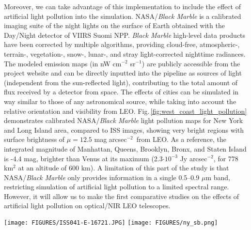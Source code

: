 \documentclass[usenames,dvipsnames,modern]{CLASS_FILES/aastex631}  %
\newcommand{\magarc}{mag arcsec\ensuremath{^{\mathrm{-2}}}}
\begin{document}
Moreover, we can take advantage of this implementation to include the effect of artificial light pollution into the simulation. NASA/\emph{Black Marble} \citep{roman+2018RSE210_113} is a calibrated imaging suite of the night lights on the surface of Earth obtained with the Day/Night detector of VIIRS Suomi NPP. \emph{Black Marble} high-level data products have been corrected by multiple algorithms, providing cloud-free, atmospheric-, terrain-, vegetation-, snow-, lunar-, and stray light-corrected nighttime radiances. The modeled emission maps (in nW cm$^{-2}$ sr$^{-1}$) are publicly accessible from the project website and  can be directly inputted into the pipeline as sources of light (independent from the sun-reflected light), contributing to the total amount of flux received by a detector from space. The effects of cities can be simulated in way similar to those of any astronomical source, while taking into account the relative orientation and visibility from LEO. Fig.\,\ref{fig:west_coast_light_pollution} demonstrates calibrated NASA/\emph{Black Marble} light pollution maps for New York and Long Island area, compared to ISS images, showing very bright regions with surface brightness of $\mu=12.5$ \magarc\ from LEO. As a reference, the integrated magnitude of Manhattan, Queens, Brooklyn, Bronx, and Staten Island is -4.4 mag, brighter than Venus at its maximum (2.3$\cdot10^{-3}$ Jy arcsec$^{-2}$, for 778 km$^{2}$ at an altitude of 600 km). A limitation of this part of the study is that NASA/\emph{Black Marble} only provides information in a single 0.5--0.9 $\mu$m band, restricting simulation of artificial light pollution to a limited spectral range. However, it will allow us to make the first comparative studies on the effects of artificial light pollution on optical/NIR LEO telescopes.\\




\begin{figure*}[t!]
 \begin{center}
\texttt{[image: FIGURES/ISS041-E-16721.JPG]}
\texttt{[image: FIGURES/ny\_sb.png]}
\vspace{-0.25cm}
\caption{Extended emission of nightlights from Low Earth Orbit. \emph{Left:} Image of New York and Long Island city lights from the International Space Station (NASA ID: \texttt{ISS041-E-16719}). \emph{Right:} Surface brightness in AB magnitudes per arcsec$^2$ generated with the NASA/\emph{Black Marble} data products ($0.5$--$0.9\,\mu$m). As a reference, the Manhattan metropolitan area presents a surface brightness of 12.5 \magarc, almost 2 orders of magnitude brighter than the surface of the Earth illuminated by the full Moon ($\mu\sim17$ \magarc).}
\label{fig:west_coast_light_pollution}
\end{center}
\end{figure*}
\end{document}
